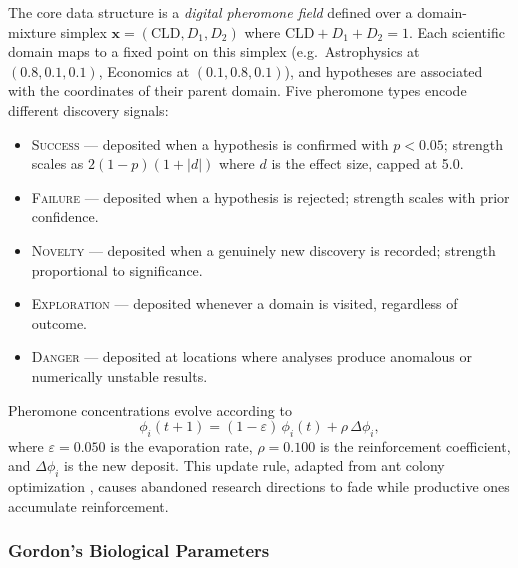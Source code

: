 \documentclass[usenatbib]{rasti}
\begin{document}
The core data structure is a \emph{digital pheromone field} defined over a domain-mixture simplex $\mathbf{x} = (\mathrm{CLD}, D_1, D_2)$ where $\mathrm{CLD} + D_1 + D_2 = 1$.
Each scientific domain maps to a fixed point on this simplex (e.g.\ Astrophysics at $(0.8, 0.1, 0.1)$, Economics at $(0.1, 0.8, 0.1)$), and hypotheses are associated with the coordinates of their parent domain.
Five pheromone types encode different discovery signals:
\begin{itemize}
  \item \textsc{Success} --- deposited when a hypothesis is confirmed with $p < 0.05$; strength scales as $2(1 - p)(1 + |d|)$ where $d$ is the effect size, capped at 5.0.
  \item \textsc{Failure} --- deposited when a hypothesis is rejected; strength scales with prior confidence.
  \item \textsc{Novelty} --- deposited when a genuinely new discovery is recorded; strength proportional to significance.
  \item \textsc{Exploration} --- deposited whenever a domain is visited, regardless of outcome.
  \item \textsc{Danger} --- deposited at locations where analyses produce anomalous or numerically unstable results.
\end{itemize}
Pheromone concentrations evolve according to
\begin{equation}
  \phi_i(t+1) = (1 - \varepsilon)\,\phi_i(t) + \rho\,\Delta\phi_i,
  \label{eq:pheromone}
\end{equation}
where $\varepsilon = 0.050$ is the evaporation rate, $\rho = 0.100$ is the reinforcement coefficient, and $\Delta\phi_i$ is the new deposit.
This update rule, adapted from ant colony optimization \citep{Dorigo1996}, causes abandoned research directions to fade while productive ones accumulate reinforcement.

\subsubsection{Gordon's Biological Parameters}
\end{document}
